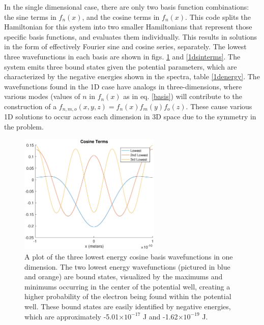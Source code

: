 \documentclass[12pt]{article}
\begin{document}
In the single dimensional case, there are only two basis function combinations: the sine terms in $f_n(x)$, and the cosine terms in $f_n(x)$.  This code splits the Hamiltonian for this system into two smaller Hamiltonians that represent those specific basis functions, and evaluates them individually.  This results in solutions in the form of effectively Fourier sine and cosine series, separately.  The lowest three wavefunctions in each basis are shown in figs. \ref{1dcosterms} and \ref{1dsinterms}.  The system emits three bound states given the potential parameters, which are characterized by the negative energies shown in the spectra, table \ref{1denergy}.  The wavefunctions found in the 1D case have analogs in three-dimensions, where various modes (values of $n$ in $f_n(x)$ as in eq. \ref{basis}) will contribute to the construction of a $f_{n,m,o}(x,y,z) = f_n(x)f_m(y)f_o(z)$.  These cause various 1D solutions to occur across each dimension in 3D space due to the symmetry in the problem.

\begin{figure}
\begin{center}
\includegraphics[width=0.6\textwidth]{./pics/1dcosterms.eps}
\end{center}
\caption{\label{1dcosterms}A plot of the three lowest energy cosine basis wavefunctions in one dimension.  The two lowest energy wavefunctions (pictured in blue and orange) are bound states, visualized by the maximums and minimums occurring in the center of the potential well, creating a higher probability of the electron being found within the potential well. These bound states are easily identified by negative energies, which are approximately -5.01$\times 10^{-17}$ J and -1.62$\times 10^{-19}$ J.}
\end{figure}
\end{document}
